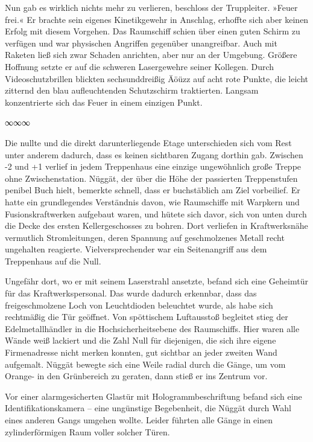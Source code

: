Nun gab es wirklich nichts mehr zu verlieren, beschloss der Truppleiter. »Feuer frei.« Er brachte sein eigenes Kinetikgewehr in Anschlag, erhoffte sich aber keinen Erfolg mit diesem Vorgehen. Das Raumschiff schien über einen guten Schirm zu verfügen und war physischen Angriffen gegenüber unangreifbar. Auch mit Raketen ließ sich zwar Schaden anrichten, aber nur an der Umgebung. Größere Hoffnung setzte er auf die schweren Lasergewehre seiner Kollegen. Durch Videoschutzbrillen blickten sechsunddreißig Äöüzz auf acht rote Punkte, die leicht zitternd den blau aufleuchtenden Schutzschirm traktierten. Langsam konzentrierte sich das Feuer in einem einzigen Punkt.

\begin{center}
	∞∞∞
\end{center}

Die nullte und die direkt darunterliegende Etage unterschieden sich vom Rest unter anderem dadurch, dass es keinen sichtbaren Zugang dorthin gab. Zwischen -2 und +1 verlief in jedem Treppenhaus eine einzige ungewöhnlich große Treppe ohne Zwischenstation. Nüggät, der über die Höhe der passierten Treppenstufen penibel Buch hielt, bemerkte schnell, dass er buchstäblich am Ziel vorbeilief. Er hatte ein grundlegendes Verständnis davon, wie Raumschiffe mit Warpkern und Fusionskraftwerken aufgebaut waren, und hütete sich davor, sich von unten durch die Decke des ersten Kellergeschosses zu bohren. Dort verliefen in Kraftwerksnähe vermutlich Stromleitungen, deren Spannung auf geschmolzenes Metall recht ungehalten reagierte. Vielversprechender war ein Seitenangriff aus dem Treppenhaus auf die Null.

Ungefähr dort, wo er mit seinem Laserstrahl ansetzte, befand sich eine Geheimtür für das Kraftwerkspersonal. Das wurde dadurch erkennbar, dass das freigeschmolzene Loch von Leuchtdioden beleuchtet wurde, als habe sich rechtmäßig die Tür geöffnet. Von spöttischem Luftausstoß begleitet stieg der Edelmetallhändler in die Hochsicherheitsebene des Raumschiffs. Hier waren alle Wände weiß lackiert und die Zahl Null für diejenigen, die sich ihre eigene Firmenadresse nicht merken konnten, gut sichtbar an jeder zweiten Wand aufgemalt. Nüggät bewegte sich eine Weile radial durch die Gänge, um vom Orange- in den Grünbereich zu geraten, dann stieß er ins Zentrum vor.

Vor einer alarmgesicherten Glastür mit Hologrammbeschriftung befand sich eine Identifikationskamera – eine ungünstige Begebenheit, die Nüggät durch Wahl eines anderen Gangs umgehen wollte. Leider führten alle Gänge in einen zylinderförmigen Raum voller solcher Türen.

